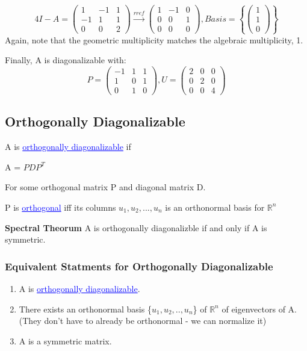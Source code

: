 \documentclass{article}
\newcommand{\bul}[1]{\textcolor{blue}{\underline{#1}}}
\newcommand{\sub}[1]{\vspace{10pt}\textbf{#1}}
\newcommand{\sbreak}{\vspace{10pt}}
\begin{document}
\sbreak

\[4I - A = \begin{pmatrix}
    1 & -1 & 1\\
    -1 & 1 & 1\\
    0 & 0 & 2
\end{pmatrix} \xrightarrow{rref} \begin{pmatrix}
    1 & -1 & 0\\
    0&0&1\\
    0&0&0
\end{pmatrix}, Basis = \left\{
    \begin{pmatrix}
        1 \\
        1\\
        0
    \end{pmatrix}
    \right\}
\]
Again, note that the geometric multiplicity matches the algebraic multiplicity, 1.

Finally, A is diagonalizable with:
\[
P = \begin{pmatrix}
    -1 & 1 & 1\\
    1 & 0 & 1\\
    0 & 1 & 0
\end{pmatrix}, U = \begin{pmatrix}
    2 & 0 & 0\\
    0 & 2 & 0\\
    0 & 0 & 4
\end{pmatrix}
\]

\subsection{Orthogonally Diagonalizable}
A is \bul{orthogonally diagonalizable} if
\begin{center}
    A = $PDP^T$
\end{center}
For some orthogonal matrix P and diagonal matrix D.

\sbreak

P is \bul{orthogonal} iff its columns {$u_1, u_2,...,u_n$} is an orthonormal basis for $\mathbb{R}^n$

\sub{Spectral Theorum}
A is orthogonally diagonalizble if and only if A is symmetric.

\subsubsection{Equivalent Statments for Orthogonally Diagonalizable}
\begin{enumerate}
    \item A is \bul{orthogonally diagonalizable}.
    \item There exists an orthonormal basis \{$u_1,u_2,..,u_n$\} of $\mathbb{R}^n$ of eigenvectors of A. (They don't have to already be orthonormal - we can normalize it)
    \item A is a symmetric matrix.
\end{enumerate}
\end{document}
